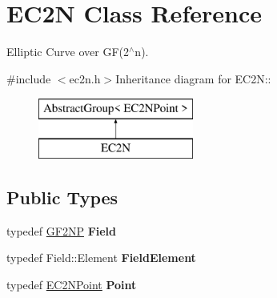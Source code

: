 \hypertarget{class_e_c2_n}{
\section{EC2N Class Reference}
\label{class_e_c2_n}
}


Elliptic Curve over GF(2$^\wedge$n).  


{\ttfamily \#include $<$ec2n.h$>$}Inheritance diagram for EC2N::\begin{figure}[H]
\begin{center}
\leavevmode
\includegraphics[height=2cm]{class_e_c2_n}
\end{center}
\end{figure}
\subsection*{Public Types}
\begin{DoxyCompactItemize}
\item 
\hypertarget{class_e_c2_n_a7088a58b07065cbfd20ee5df924ed99e}{
typedef \hyperlink{class_g_f2_n_p}{GF2NP} {\bfseries Field}}
\label{class_e_c2_n_a7088a58b07065cbfd20ee5df924ed99e}

\item 
\hypertarget{class_e_c2_n_ae03206f65d1a99b107de72c7d86704c2}{
typedef Field::Element {\bfseries FieldElement}}
\label{class_e_c2_n_ae03206f65d1a99b107de72c7d86704c2}

\item 
\hypertarget{class_e_c2_n_a084d1d7e824e989357c2ac9bf8b077c1}{
typedef \hyperlink{struct_e_c2_n_point}{EC2NPoint} {\bfseries Point}}
\label{class_e_c2_n_a084d1d7e824e989357c2ac9bf8b077c1}

\end{DoxyCompactItemize}
